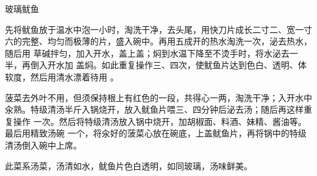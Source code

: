\begin{recipe}{玻璃鱿鱼}

\ingredients


\preparation

\step 先将鱿鱼放于温水中泡一小时，淘洗干净，去头尾，用快刀片成长二寸二、宽一寸
六的完整、均匀而极薄的片，盛入碗中。再用五成开的热水淘洗一次，泌去热水，随后用
草碱拌匀，加入开水，盖上盖；焖到水温下降至不烫手时，将水泌去一半，再倒入开水加
盖焖。如此重复操作三、四次，使鱿鱼片达到色白、透明、体软度，然后用清水漂着待用
。

\step 菠菜去外叶不用，但须保持根上有红色的一段，共得心一两，淘洗干净；入开水中
汆熟。特级清汤半斤入锅烧开，放入鱿鱼片喂三、四分钟后泌去汤；随后再这样重复操作
一次。然后将特级清汤放入锅中烧开，加胡椒面、料酒、妹精、酱油等。最后用精致汤碗
一个，将汆好的菠菜心放在碗底，上盖鱿鱼片，再将锅中的特级清汤倒入碗中上席。

\features

此菜系汤菜，汤清如水，鱿鱼片色白透明，如同玻璃，汤味鲜美。

\end{recipe}

